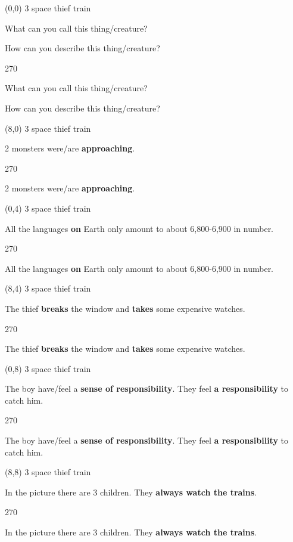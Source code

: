 \documentclass[a4paper]{article}
\newenvironment{itemize*}%
{\begin{itemize}%
 \setlength{\itemsep}{0.0cm}%
 \setlength{\parsep}{0pt}%
 \setlength{\parskip}{0pt}}%
{\end{itemize}}
\newcommand{\mycard}[3]{%
	\small #1 #2
	\par
	\parbox[t][6.8cm][c]{9.5cm}{%
	\par
	\myleft{#3}
	\par
	\myright{#3}
	}
}
\newcommand{\myleft}[1]{%
	\begin{sideways}
	\hspace*{-0.9cm}
		\parbox[t][2.7cm][t]{6.5cm}{%
		\Large #1
		}
	\end{sideways}
}
\newcommand{\myright}[1]{%
	\hspace*{6.5cm}
	\begin{turn}{270}
	\hspace*{-7.1cm}
		\parbox[t][2.7cm][t]{6.5cm}{%
		\Large #1
		}
	\end{turn}
}
\begin{document}
\begin{textblock}{8}(0,0)
\mycard{3}{space thief train}{
\begin{itemize*}
\item What can you call this thing/creature?
\item How can you describe this thing/creature?
\end{itemize*}
}
\end{textblock}

\begin{textblock}{8}(8,0)
\mycard{3}{space thief train}{
\begin{itemize*}
\item 2 monsters were/are \textbf{approaching}.
\end{itemize*}
}
\end{textblock}

\begin{textblock}{8}(0,4)
\mycard{3}{space thief train}{
\begin{itemize*}
\item All the languages \textbf{on} Earth \normalsize only amount to about 6,800-6,900 in number.
\end{itemize*}
}
\end{textblock}

\begin{textblock}{8}(8,4)
\mycard{3}{space thief train}{
\begin{itemize*}
\item The thief \textbf{breaks} the window and \textbf{takes} some expensive watches.
\end{itemize*}
}
\end{textblock}

\begin{textblock}{8}(0,8)
\mycard{3}{space thief train}{
\begin{itemize*}
\item The boy have/feel a \textbf{sense of responsibility}. They feel \textbf{a responsibility} to catch him.
\end{itemize*}
}
\end{textblock}

\begin{textblock}{8}(8,8)
\mycard{3}{space thief train}{
\begin{itemize*}
\item In the picture there are 3 children. They \textbf{always watch the trains}.
\end{itemize*}
}
\end{textblock}
\end{document}
